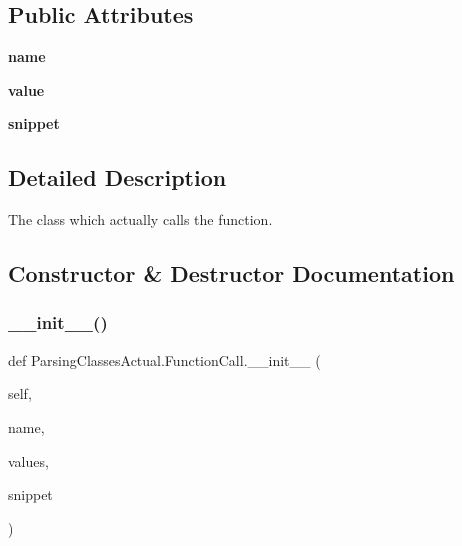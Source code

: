 \subsection*{Public Attributes}
\begin{DoxyCompactItemize}
\item 
\mbox{\label{class_parsing_classes_actual_1_1_function_call_a69419387310e0209d3b0149a12cc7c51}} 
{\bfseries name}
\item 
\mbox{\label{class_parsing_classes_actual_1_1_function_call_a382a98c12c5f842574a3d29b7001129e}} 
{\bfseries value}
\item 
\mbox{\label{class_parsing_classes_actual_1_1_function_call_a52df8bb5a7fdf2d88f6e9f1155950e9d}} 
{\bfseries snippet}
\end{DoxyCompactItemize}


\subsection{Detailed Description}
The class which actually calls the function. 

\subsection{Constructor \& Destructor Documentation}
\mbox{\label{class_parsing_classes_actual_1_1_function_call_a8129d2bc94019485d3e27f67f825a7c1}} 
\subsubsection{\texorpdfstring{\+\_\+\+\_\+init\+\_\+\+\_\+()}{\_\_init\_\_()}}
{\footnotesize\ttfamily def Parsing\+Classes\+Actual.\+Function\+Call.\+\_\+\+\_\+init\+\_\+\+\_\+ (\begin{DoxyParamCaption}\item[{}]{self,  }\item[{}]{name,  }\item[{}]{values,  }\item[{}]{snippet }\end{DoxyParamCaption})}



